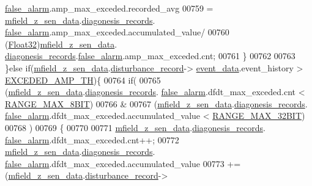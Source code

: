 \begin{DoxyCode}
      \hyperlink{a00019_a55109284fe950025b5d9f3dde60d4553}{false\_alarm}.amp\_max\_exceded.recorded\_avg
00759                      = \hyperlink{a00053_ae42bea09c571df9fad890518725d5cf4}{mfield\_z\_sen\_data}.\hyperlink{a00027_a2bd79ce84bbd6b7f50d38954f7ae475e}{diagonesis\_records}.
      \hyperlink{a00019_a55109284fe950025b5d9f3dde60d4553}{false\_alarm}.amp\_max\_exceded.accumulated\_value/
00760                              (\hyperlink{a00072_a87d38f886e617ced2698fc55afa07637}{Float32})\hyperlink{a00053_ae42bea09c571df9fad890518725d5cf4}{mfield\_z\_sen\_data}.
      \hyperlink{a00027_a2bd79ce84bbd6b7f50d38954f7ae475e}{diagonesis\_records}.\hyperlink{a00019_a55109284fe950025b5d9f3dde60d4553}{false\_alarm}.amp\_max\_exceded.cnt;
00761               \}
00762 
00763              \}\textcolor{keywordflow}{else} \textcolor{keywordflow}{if}(\hyperlink{a00053_ae42bea09c571df9fad890518725d5cf4}{mfield\_z\_sen\_data}.\hyperlink{a00027_ac9b38e2c1d3f1013a88d33506c754152}{disturbance\_record}->
      \hyperlink{a00028_a8c0bda69e71ef674e60da47ad0be9ab0}{event\_data}.event\_history > \hyperlink{a00019_a9c5372190518a7d696da393f1a9a5fb9}{EXCEDED\_AMP\_TH})\{
00764              \textcolor{keywordflow}{if}(
00765                 (\hyperlink{a00053_ae42bea09c571df9fad890518725d5cf4}{mfield\_z\_sen\_data}.\hyperlink{a00027_a2bd79ce84bbd6b7f50d38954f7ae475e}{diagonesis\_records}.
      \hyperlink{a00019_a55109284fe950025b5d9f3dde60d4553}{false\_alarm}.dfdt\_max\_exceded.cnt < \hyperlink{a00021_ae0c75a1cb44e5d3f00ec7c9e40acfda8}{RANGE\_MAX\_8BIT})
00766                 &
00767                 (\hyperlink{a00053_ae42bea09c571df9fad890518725d5cf4}{mfield\_z\_sen\_data}.\hyperlink{a00027_a2bd79ce84bbd6b7f50d38954f7ae475e}{diagonesis\_records}.
      \hyperlink{a00019_a55109284fe950025b5d9f3dde60d4553}{false\_alarm}.dfdt\_max\_exceded.accumulated\_value < \hyperlink{a00021_a334bd006b6d2b397dbfc620d62c3c35c}{RANGE\_MAX\_32BIT})
00768                )
00769              \{
00770 
00771                  \hyperlink{a00053_ae42bea09c571df9fad890518725d5cf4}{mfield\_z\_sen\_data}.\hyperlink{a00027_a2bd79ce84bbd6b7f50d38954f7ae475e}{diagonesis\_records}.
      \hyperlink{a00019_a55109284fe950025b5d9f3dde60d4553}{false\_alarm}.dfdt\_max\_exceded.cnt++;
00772                  \hyperlink{a00053_ae42bea09c571df9fad890518725d5cf4}{mfield\_z\_sen\_data}.\hyperlink{a00027_a2bd79ce84bbd6b7f50d38954f7ae475e}{diagonesis\_records}.
      \hyperlink{a00019_a55109284fe950025b5d9f3dde60d4553}{false\_alarm}.dfdt\_max\_exceded.accumulated\_value
00773                  +=(\hyperlink{a00053_ae42bea09c571df9fad890518725d5cf4}{mfield\_z\_sen\_data}.\hyperlink{a00027_ac9b38e2c1d3f1013a88d33506c754152}{disturbance\_record}->

\end{DoxyCode}
